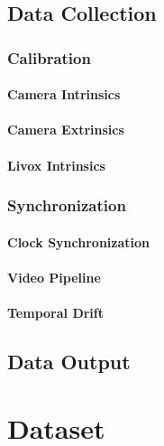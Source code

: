\documentclass{erauthesis}
\begin{document}
    \section{Data Collection}
    
        \subsection{Calibration}
        
            \subsubsection{Camera Intrinsics}
            
            \subsubsection{Camera Extrinsics}
            
            \subsubsection{Livox Intrinsics}
            
        \subsection{Synchronization}
        
            \subsubsection{Clock Synchronization}
            
            \subsubsection{Video Pipeline}
            
            \subsubsection{Temporal Drift}
            
    \section{Data Output}

\chapter{Dataset}
\end{document}
